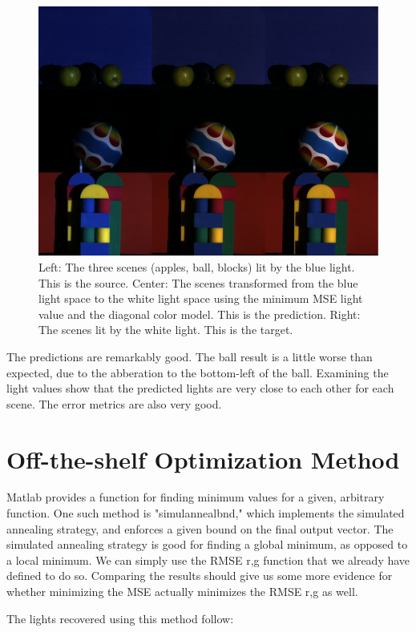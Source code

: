 \documentclass{article}
\begin{document}
\begin{figure}[!ht]
	\centering
	\includegraphics[width=120mm]{figs/results-msemin-3x3.png}
	\caption{Left: The three scenes (apples, ball, blocks) lit by the blue light. This is the source. 
        Center: The scenes transformed from the blue light space to the white light space 
        using the minimum MSE light value and the diagonal color model. 
        This is the prediction.
        Right: The scenes lit by the white light. This is the target.}
\end{figure}

The predictions are remarkably good. The ball result is a little worse than 
expected, due to the abberation to the bottom-left of the ball. Examining the 
light values show that the predicted lights are very close to each other for 
each scene. The error metrics are also very good.

\section{Off-the-shelf Optimization Method}

Matlab provides a function for finding minimum values for a given, arbitrary 
function. One such method is "simulannealbnd," which implements the simulated 
annealing strategy, and enforces a given bound on the final output vector. The 
simulated annealing strategy is good for finding a global minimum, as opposed to 
a local minimum. We can simply use the RMSE r,g function that we already have 
defined to do so. Comparing the results should give us some more evidence for 
whether minimizing the MSE actually minimizes the RMSE r,g as well.

The lights recovered using this method follow:
\end{document}

